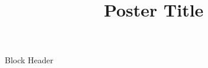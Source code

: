 \documentclass{tugPoster}
\title{Poster Title}
\begin{document}
	\maketitle

	\begin{IPTblock}[twocol]{Block Header}
		\begin{IPTcols}{0.5}
			\lipsum[1]
		\IPTcolbreak
			\lipsum[2]
		\end{IPTcols}
	\IPTcolbreak
		\lipsum[3-4]
	\end{IPTblock}
\end{document}
